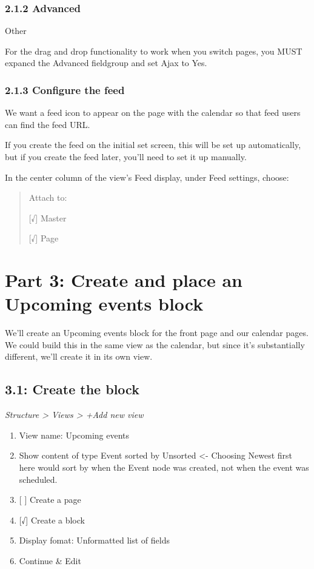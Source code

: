 \documentclass[letterpaper,10pt,english]{sphinxmanual}
\begin{document}
\subsubsection{2.1.2 Advanced}
\label{event_calendar:advanced}
Other

For the drag and drop functionality to work when you switch pages, you MUST expancd the Advanced fieldgroup and set Ajax to Yes.


\subsubsection{2.1.3 Configure the feed}
\label{event_calendar:configure-the-feed}
We want a feed icon to appear on the page with the calendar so that feed users can find the feed URL.

If you create the feed on the initial set screen, this will be set up automatically, but if you create the feed later, you'll need to set it up manually.

In the center column of the view's Feed display, under Feed settings, choose:
\begin{quote}

Attach to:

{[}√{]} Master

{[}√{]} Page
\end{quote}


\section{Part 3: Create and place an Upcoming events block}
\label{event_calendar:part-3-create-and-place-an-upcoming-events-block}
We'll create an Upcoming events block for the front page and our calendar pages. We could build this in the same view as the calendar, but since it's substantially different, we'll create it in its own view.


\subsection{3.1: Create the block}
\label{event_calendar:create-the-block}
\emph{Structure \textgreater{} Views \textgreater{} +Add new view}
\begin{enumerate}
\item {} 
View name: Upcoming events

\item {} 
Show content of type Event sorted by Unsorted \textless{}- Choosing Newest first here would sort by when the Event node was created, not when the event was scheduled.

\item {} 
{[} {]} Create a page

\item {} 
{[}√{]} Create a block

\item {} 
Display fomat: Unformatted list of fields

\item {} 
Continue \& Edit

\end{enumerate}
\end{document}
